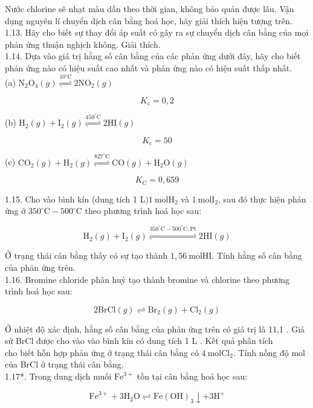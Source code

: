 \documentclass[10pt]{article}
\begin{document}
Nước chlorine sẽ nhạt màu dần theo thời gian, không bảo quản được lâu. Vận dụng nguyên lí chuyển dịch cân bằng hoá học, hãy giải thích hiện tượng trên.\\
1.13. Hãy cho biết sự thay đổi áp suất có gây ra sự chuyển dịch cân bằng của mọi phản ứng thuận nghịch không. Giải thích.\\
1.14. Dựa vào giá trị hằng số cân bằng của các phản ứng dưới đây, hãy cho biết phản ứng nào có hiệu suất cao nhất và phản ứng nào có hiệu suất thấp nhất.\\
(a) $\mathrm{N}_{2} \mathrm{O}_{4}(g) \stackrel{10^{\circ} \mathrm{C}}{\rightleftharpoons} 2 \mathrm{NO}_{2}(g)$

$$
K_{\mathrm{c}}=0,2
$$

(b) $\mathrm{H}_{2}(g)+\mathrm{I}_{2}(g) \stackrel{450^{\circ} \mathrm{C}}{\rightleftharpoons} 2 \mathrm{HI}(g)$

$$
K_{\mathrm{c}}=50
$$

(c) $\mathrm{CO}_{2}(g)+\mathrm{H}_{2}(g) \stackrel{827^{\circ} \mathrm{C}}{\rightleftharpoons} \mathrm{CO}(g)+\mathrm{H}_{2} \mathrm{O}(g)$

$$
K_{\mathrm{C}}=0,659
$$

1.15. Cho vào bình kín (dung tích 1 L$) 1 \mathrm{~mol} \mathrm{H}_{2}$ và $1 \mathrm{~mol} \mathrm{I}_{2}$, sau đó thực hiện phản ứng ở $350^{\circ} \mathrm{C}-500^{\circ} \mathrm{C}$ theo phương trình hoá học sau:

$$
\mathrm{H}_{2}(g)+\mathrm{I}_{2}(g) \stackrel{350^{\circ} \mathrm{C}-500^{\circ} \mathrm{C}, \mathrm{Pt}}{\rightleftharpoons} 2 \mathrm{HI}(g)
$$

Ở trạng thái cân bằng thấy có sự tạo thành $1,56 \mathrm{~mol} \mathrm{HI}$. Tính hằng số cân bằng của phản ứng trên.\\
1.16. Bromine chloride phân huỷ tạo thành bromine và chlorine theo phương trình hoá học sau:

$$
2 \mathrm{BrCl}(g) \rightleftharpoons \mathrm{Br}_{2}(g)+\mathrm{Cl}_{2}(g)
$$

Ở nhiệt độ xác định, hằng số cân bằng của phản ứng trên có giá trị là 11,1 . Giả sử BrCl được cho vào vào bình kín có dung tích 1 L . Kết quả phân tích\\
cho biết hỗn hợp phản ứng ở trạng thái cân bằng có $4 \mathrm{~mol} \mathrm{Cl}_{2}$. Tính nồng độ mol của BrCl ở trạng thái cân bằng.\\
1.17*. Trong dung dịch muối $\mathrm{Fe}^{3+}$ tồn tại cân bằng hoá học sau:

$$
\mathrm{Fe}^{3+}+3 \mathrm{H}_{2} \mathrm{O} \rightleftharpoons \mathrm{Fe}(\mathrm{OH})_{3} \downarrow+3 \mathrm{H}^{+}
$$
\end{document}
